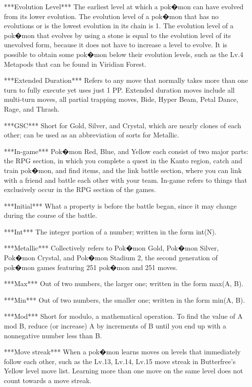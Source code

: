 \documentclass[reprint, aps, prl, paper=A4]{revtex4-1}
\begin{document}
***Evolution Level***
The earliest level at which a pok�mon can have evolved from its lower evolution. The evolution
level of a pok�mon that has no evolutions or is the lowest evolution in its chain is 1. The
evolution level of a pok�mon that evolves by using a stone is equal to the evolution level of
its unevolved form, because it does not have to increase a level to evolve. It is possible to
obtain some pok�mon below their evolution levels, such as the Lv.4 Metapods that can be found
in Viridian Forest.

***Extended Duration***
Refers to any move that normally takes more than one turn to fully execute yet uses just 1 PP.
Extended duration moves include all multi-turn moves, all partial trapping moves, Bide, Hyper
Beam, Petal Dance, Rage, and Thrash.

***GSC***
Short for Gold, Silver, and Crystal, which are nearly clones of each other; can be used as an
abbreviation of sorts for Metallic.

***In-game***
Pok�mon Red, Blue, and Yellow each consist of two major parts: the RPG section, in which you
complete a quest in the Kanto region, catch and train pok�mon, and find items, and the link
battle section, where you can link with a friend and battle each other with your team. In-game
refers to things that exclusively occur in the RPG section of the games.

***Initial***
What a property is before the battle began, since it may change during the course of the
battle.

***Int***
The integer portion of a number; written in the form int(N).

***Metallic***
Collectively refers to Pok�mon Gold, Pok�mon Silver, Pok�mon Crystal, and Pok�mon Stadium 2,
the second generation of pok�mon games featuring 251 pok�mon and 251 moves.

***Max***
Out of two numbers, the larger one; written in the form max(A, B).

***Min***
Out of two numbers, the smaller one; written in the form min(A, B).

***Mod***
Short for modulo, a mathematical operation. To find the value of A mod B, reduce (or increase)
A by increments of B until you end up with a nonnegative number less than B.

***Move streak***
When a pok�mon learns moves on levels that immediately follow each other, such as the Lv.13,
Lv.14, Lv.15 move streak in Butterfree's Yellow level move list. Learning more than one move on
the same level does not count towards a move streak.
\end{document}
